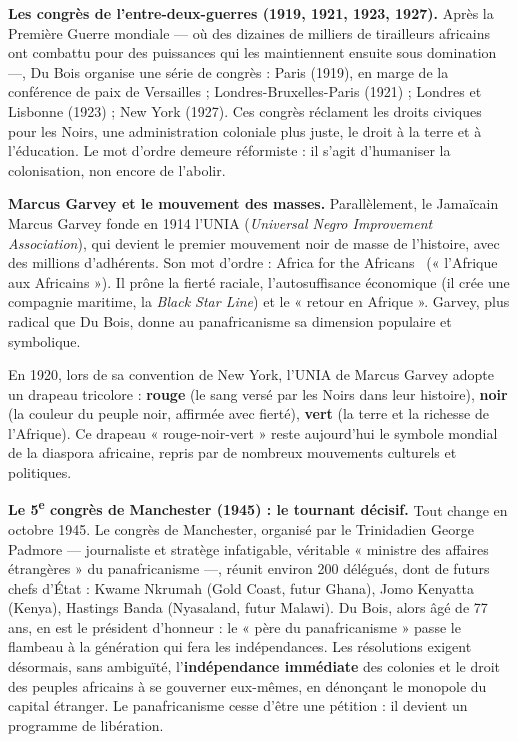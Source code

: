 \documentclass[11pt]{article}
\newcommand{\cle}[1]{{\popxbold\color{popdark}#1}}
\begin{document}
\textbf{Les congrès de l'entre-deux-guerres (1919, 1921, 1923, 1927).} Après la Première Guerre mondiale — où des dizaines de milliers de tirailleurs africains ont combattu pour des puissances qui les maintiennent ensuite sous domination —, Du Bois organise une série de congrès : Paris (1919), en marge de la conférence de paix de Versailles ; Londres-Bruxelles-Paris (1921) ; Londres et Lisbonne (1923) ; New York (1927). Ces congrès réclament les droits civiques pour les Noirs, une administration coloniale plus juste, le droit à la terre et à l'éducation. Le mot d'ordre demeure réformiste : il s'agit d'humaniser la colonisation, non encore de l'abolir.

\textbf{Marcus Garvey et le mouvement des masses.} Parallèlement, le Jamaïcain \cle{Marcus Garvey} fonde en 1914 l'UNIA (\emph{Universal Negro Improvement Association}), qui devient le premier mouvement noir de masse de l'histoire, avec des millions d'adhérents. Son mot d'ordre : \guillemotleft Africa for the Africans \guillemotright\ (« l'Afrique aux Africains »). Il prône la fierté raciale, l'autosuffisance économique (il crée une compagnie maritime, la \emph{Black Star Line}) et le « retour en Afrique ». Garvey, plus radical que Du Bois, donne au panafricanisme sa dimension populaire et symbolique.

\begin{savaistu}
En 1920, lors de sa convention de New York, l'UNIA de Marcus Garvey adopte un drapeau tricolore : \textbf{rouge} (le sang versé par les Noirs dans leur histoire), \textbf{noir} (la couleur du peuple noir, affirmée avec fierté), \textbf{vert} (la terre et la richesse de l'Afrique). Ce drapeau « rouge-noir-vert » reste aujourd'hui le symbole mondial de la diaspora africaine, repris par de nombreux mouvements culturels et politiques.
\end{savaistu}

\textbf{Le 5\textsuperscript{e} congrès de Manchester (1945) : le tournant décisif.} Tout change en octobre 1945. Le congrès de Manchester, organisé par le Trinidadien \cle{George Padmore} — journaliste et stratège infatigable, véritable « ministre des affaires étrangères » du panafricanisme —, réunit environ 200 délégués, dont de futurs chefs d'État : Kwame Nkrumah (Gold Coast, futur Ghana), Jomo Kenyatta (Kenya), Hastings Banda (Nyasaland, futur Malawi). Du Bois, alors âgé de 77 ans, en est le président d'honneur : le « père du panafricanisme » passe le flambeau à la génération qui fera les indépendances. Les résolutions exigent désormais, sans ambiguïté, l'\textbf{indépendance immédiate} des colonies et le droit des peuples africains à se gouverner eux-mêmes, en dénonçant le monopole du capital étranger. Le panafricanisme cesse d'être une pétition : il devient un programme de libération.
\end{document}
